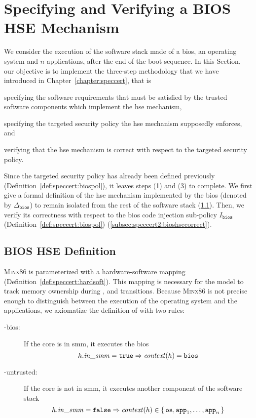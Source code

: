 \section{Specifying and Verifying a BIOS HSE Mechanism}
\label{sec:speccert2:verif}

We consider the execution of the software stack made of a \ac{bios}, an
operating system and \( n \) applications, after the end of the boot sequence.
%
In this Section, our objective is to implement the three-step methodology that
we have introduced in Chapter~\ref{chapter:speccert}, that is
%
\begin{inparaenum}[(1)]
\item specifying the software requirements that must be satisfied by the trusted
  software components which implement the \ac{hse} mechanism,
%
\item specifying the targeted security policy the \ac{hse} mechanism supposedly
  enforces, and
%
\item verifying that the \ac{hse} mechanism is correct with respect to the
  targeted security policy.
\end{inparaenum}

Since the targeted security policy has already been defined previously
(Definition~\ref{def:speccert:biospol}), it leaves steps (1) and (3) to
complete.
%
We first give a formal definition of the \ac{hse} mechanism implemented by the
\ac{bios} (denoted by \( \Delta_{\mathtt{bios}} \)) to remain isolated from the
rest of the software stack (\ref{subsec:speccert2:bioshsedef}).
%
Then, we verify its correctness with respect to the \ac{bios} code injection
sub-policy \( I_{\mathtt{bios}} \) (Definition~\ref{def:speccert:biospol})
(\ref{subsec:speccert2:bioshsecorrect}).

\subsection{BIOS HSE Definition}
\label{subsec:speccert2:bioshsedef}

{\scshape Minx86} is parameterized with a hardware-software mapping
 (Definition~\ref{def:speccert:hardsoft}).
%
This mapping is necessary for the model to track memory ownership during
,  and  transitions.
%
Because {\scshape Minx86} is not precise enough to distinguish between the
execution of the operating system and the applications, we axiomatize the
definition of  with two rules:
%
\begin{description}
\item [-bios:] If the core is in \ac{smm}, it executes the
  \ac{bios}
  \[
    h.\mathit{in\_smm} = \mathtt{true} \Rightarrow \mathit{context}(h) = \mathtt{bios}
  \]
\item [-untrusted:] If the core is not in \ac{smm}, it executes
  another component of the software stack
  \[
    h.\mathit{in\_smm} = \mathtt{false} \Rightarrow \mathit{context}(h) \in
    \{\,\mathtt{os}, \mathtt{app}_1, \dots, \mathtt{app}_n\,\}
  \]
\end{description}

